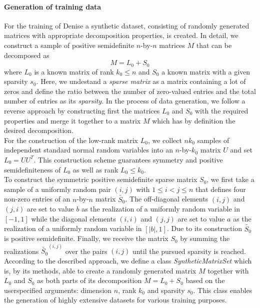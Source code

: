 \paragraph{Generation of training data}
For the training of Denise a synthetic dataset, consisting of randomly generated matrices with appropriate decomposition properties, is created. In detail, we construct a sample of positive semidefinite $n$-by-$n$ matrices $M$ that can be decomposed as
\[
 M = L_0 + S_0
\]
where $L_0$ is a known matrix of rank $k_0 \leq n$ and $S_0$ a known matrix with a given sparsity $s_0$. Here, we undestand a \textit{sparse matrix} as a matrix containing a lot of zeros and define the ratio between the number of zero-valued entries and the total number of entries as its \textit{sparsity}. In the process of data generation, we follow a reverse approach by constructing first the matrices $L_0$ and $S_0$ with the required properties and merge it together to a matrix $M$ which has by definition the desired decomposition.\\

For the construction of the low-rank matrix $L_0$, we collect $nk_0$ samples of independent standard normal random variables into an $n$-by-$k_0$ matrix $U$ and set $L_0 = UU^T$. This construction scheme guarantees symmetry and positive semidefiniteness of $L_0$ as well as rank $L_0 \leq k_0$.\\

To construct the symmetric positive semidefinite sparse matrix $S_0$, we first take a sample of a uniformly random pair $(i,j)$ with $1 \leq i < j \leq n$ that defines four non-zero entries of an $n$-by-$n$ matrix $\tilde{S_0}$. The off-diagonal elements $(i,j)$ and $(j,i)$ are set to value $b$ as the realization of a uniformly random variable in $[-1,1]$ while the diagonal elements $(i,i)$ and $(j,j)$ are set to value $a$ as the realization of a uniformly random variable in $[\vert b \vert,1]$. Due to its construction $\tilde{S_0}$ is positive semidefinite. Finally, we receive the matrix $S_0$ by summing the realizations $\tilde{S_0}^{(i,j)}$ over the pairs $(i,j)$ until the pursued sparsity is reached.\\

According to the described approach, we define a class \textit{SyntheticMatrixSet} which is, by its methods, able to create a randomly generated matrix $M$ together with $L_0$ and $S_0$ as both parts of its decomposition  $M = L_0 + S_0$ based on the userspecified arguments: dimension $n$, rank $k_0$ and sparsity $s_0$. This class enables the generation of highly extensive datasets for various training purposes.

